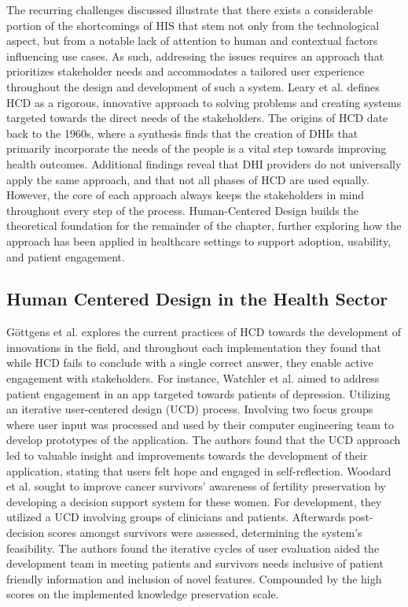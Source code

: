 \documentclass[11pt,a4paper,titlepage]{article}
\begin{document}
	The recurring challenges discussed illustrate that there exists a considerable portion of the shortcomings of HIS that stem not only from the technological aspect, but from a notable lack of attention to human and contextual factors influencing use cases. As such, addressing the issues requires an approach that prioritizes stakeholder needs and accommodates a tailored user experience throughout the design and development of such a system. Leary et al. \cite{leary_2022_an} defines HCD as a rigorous, innovative approach to solving problems and creating systems targeted towards the direct needs of the stakeholders. The origins of HCD date back to the 1960s, where a synthesis finds that the creation of DHIs that primarily incorporate the needs of the people is a vital step towards improving health outcomes. Additional findings reveal that DHI providers do not universally apply the same approach, and that not all phases of HCD are used equally. However, the core of each approach always keeps the stakeholders in mind throughout every step of the process. Human-Centered Design builds the theoretical foundation for the remainder of the chapter, further exploring how the approach has been applied in healthcare settings to support adoption, usability, and patient engagement. 
	
	
	\subsection{Human Centered Design in the Health Sector}
	Göttgens et al. \cite{gttgens_2021_the} explores the current practices of HCD towards the development of innovations in the field, and throughout each implementation they found that while HCD fails to conclude with a single correct answer, they enable active engagement with stakeholders. For instance, Watchler et al. \cite{wachtler_2018_development} aimed to address patient engagement in an app targeted towards patients of depression. Utilizing an iterative user-centered design (UCD) process. Involving two focus groups where user input was processed and used by their computer engineering team to develop prototypes of the application. The authors found that the UCD approach led to valuable insight and improvements towards the development of their application, stating that users felt hope and engaged in self-reflection. Woodard et al. \cite{woodard_2018_the} sought to improve cancer survivors' awareness of fertility preservation by developing a decision support system for these women. For development, they utilized a UCD involving groups of clinicians and patients. Afterwards post-decision scores amongst survivors were assessed, determining the system's feasibility. The authors found the iterative cycles of user evaluation aided the development team in meeting patients and survivors needs inclusive of patient friendly information and inclusion of novel features. Compounded by the high scores on the implemented knowledge preservation scale.
	
\end{document}
